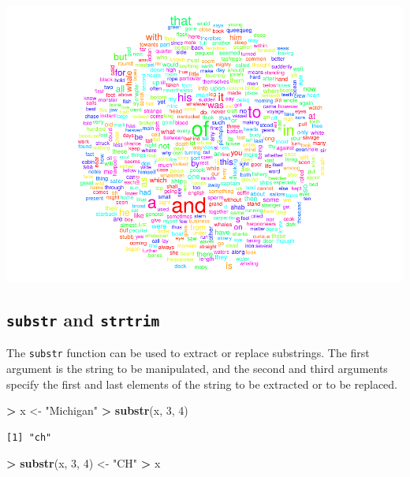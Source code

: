 \documentclass[
]{krantz}
\makeatletter
\newenvironment{Shaded}{\begin{snugshade}}{\end{snugshade}}
\newcommand{\DecValTok}[1]{\textcolor[rgb]{0.06,0.06,0.06}{#1}}
\newcommand{\KeywordTok}[1]{\textcolor[rgb]{0.27,0.27,0.27}{\textbf{#1}}}
\newcommand{\NormalTok}[1]{#1}
\newcommand{\OperatorTok}[1]{\textcolor[rgb]{0.43,0.43,0.43}{\textbf{#1}}}
\newcommand{\StringTok}[1]{\textcolor[rgb]{0.5,0.5,0.5}{#1}}
\newenvironment{kframe}{%
\medskip{}
\setlength{\fboxsep}{.8em}
 \def\at@end@of@kframe{}%
 \ifinner\ifhmode%
  \def\at@end@of@kframe{\end{minipage}}%
  \begin{minipage}{\columnwidth}%
 \fi\fi%
 \def\FrameCommand##1{\hskip\@totalleftmargin \hskip-\fboxsep
 \colorbox{shadecolor}{##1}\hskip-\fboxsep
     \hskip-\linewidth \hskip-\@totalleftmargin \hskip\columnwidth}%
 \MakeFramed {\advance\hsize-\width
   \@totalleftmargin\z@ \linewidth\hsize
   \@setminipage}}%
 {\par\unskip\endMakeFramed%
 \at@end@of@kframe}
\renewenvironment{Shaded}{\begin{kframe}}{\end{kframe}}
\makeatother
\begin{document}
\includegraphics{bookdown_files/figure-latex/unnamed-chunk-287-1.pdf}

\hypertarget{substr-and-strtrim}{%
\subsection{\texorpdfstring{\texttt{substr} and \texttt{strtrim}}{substr and strtrim}}\label{substr-and-strtrim}}

The \texttt{substr} function can be used to extract or replace substrings. The first argument is the string to be manipulated, and the second and third arguments specify the first and last elements of the string to be extracted or to be replaced.

\begin{Shaded}
\begin{Highlighting}[]
\OperatorTok{\textgreater{}}\StringTok{ }\NormalTok{x \textless{}{-}}\StringTok{ "Michigan"}
\OperatorTok{\textgreater{}}\StringTok{ }\KeywordTok{substr}\NormalTok{(x, }\DecValTok{3}\NormalTok{, }\DecValTok{4}\NormalTok{)}
\end{Highlighting}
\end{Shaded}

\begin{verbatim}
[1] "ch"
\end{verbatim}

\begin{Shaded}
\begin{Highlighting}[]
\OperatorTok{\textgreater{}}\StringTok{ }\KeywordTok{substr}\NormalTok{(x, }\DecValTok{3}\NormalTok{, }\DecValTok{4}\NormalTok{) \textless{}{-}}\StringTok{ "CH"}
\OperatorTok{\textgreater{}}\StringTok{ }\NormalTok{x}
\end{Highlighting}
\end{Shaded}
\end{document}
